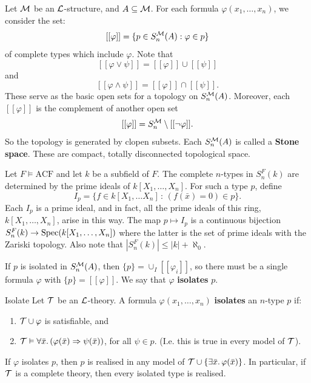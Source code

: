 \documentclass{article}
\numberwithin{thm}{subsection}
\begin{document}
\endproof
Let $\mathcal{M}$ be an $\mathcal{L}$-structure, and $A \subseteq \mathcal{M}$. For each formula $\varphi(x_{1}, \dots, x_{n})$, we consider the set: \[ [[\varphi]]=\{ p \in S_{n}^{\mathcal{M}}(A) : \varphi \in p\} \] of complete types which include $\varphi$. Note that \[ [[\varphi \vee \psi]] = [[\varphi]] \cup [[\psi]]\] and \[ [[\varphi \wedge \psi]] = [[\varphi]] \cap [[\psi]].\] These serve as the basic open sets for a topology on $S_{n}^{\mathcal{M}}(A)$. Moreover, each $[[\varphi]]$ is the complement of another open set \[[[\varphi]] = S_{n}^{\mathcal{M}} \setminus [[ \neg \varphi]].\] So the topology is generated by clopen subsets. Each $S_{n}^{\mathcal{M}}(A)$ is called a \textbf{Stone space}. These are compact, totally disconnected topological space.
\begin{ex}
    Let $F \models \text{ACF}$ and let $k$ be a subfield of $F$. The complete $n$-types in $S_{n}^{F}(k)$ are determined by the prime ideals of $k[X_{1},\dots, X_{n}]$. For such a type $p$, define \[ I_{p} = \{ f \in k[X_{1},\dots X_{n}] \, : \, (f(\bar x)=0) \in p\}.\]
    Each $I_{p}$ is a prime ideal, and in fact, all the prime ideals of this ring, $k[X_{1}, \dots, X_{n}]$, arise in this way. \gap The map $p \mapsto I_{p}$ is a continuous bijection $S_{n}^{F}(k) \to \operatorname{Spec}(k[X_{1}, \dots, X_{n}])$ where the latter is the set of prime ideals with the Zariski topology. Also note that $|S_{n}^{F}(k)| \leq |k| + \aleph_{0}$.
\end{ex}
If $p$ is isolated in $S_{n}^{\mathcal{M}}(A)$, then $\{p\} = \cup_{I}[[\varphi_i]]$, so there must be a single formula $\varphi$ with $\{p\} = [[\varphi]]$. We say that $\varphi$ \textbf{isolates} $p$.
\begin{fancydefine}{Isolate}
    Let $\mathcal{T}$ be an $\mathcal{L}$-theory. A formula $\varphi(x_{1}, \dots, x_{n})$ \textbf{isolates} an $n$-type $p$ if:
    \begin{enumerate}
        \item $\mathcal{T} \cup \varphi$ is satisfiable, and
        \item $\mathcal{T} \vDash \forall \bar x. \, (\varphi( \bar x) \Rightarrow \psi(\bar x))$, for all $\psi \in p$. (I.e. this is true in every model of $\mathcal{T}$).
    \end{enumerate}
\end{fancydefine}
\begin{fancyprop}{}
    If $\varphi$ isolates $p$, then $p$ is realised in any model of $\mathcal{T} \cup \{ \exists \bar x.\, \varphi( \bar x)\}$. In particular, if $\mathcal{T}$ is a complete theory, then every isolated type is realised.
\end{fancyprop}
\end{document}
